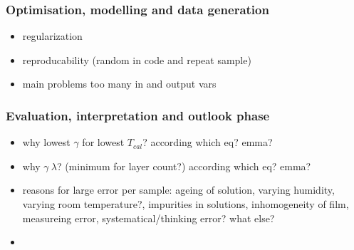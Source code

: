 \subsubsection{Optimisation, modelling and data generation}
\begin{itemize}
    \item regularization
    \item reproducability (random in code and repeat sample)
    \item main problems too many in and output vars
\end{itemize}
\subsubsection{Evaluation, interpretation and outlook phase}
\begin{itemize}
    \item why lowest $\gamma$ for lowest $T_{cal}$? according which eq? emma? 
    \item why $\gamma ~ \lambda$? (minimum for layer count?) according which eq? emma? 
    \item reasons for large error per sample: ageing of solution, varying humidity, varying room temperature?, impurities in solutions, inhomogeneity of film, measureing error, systematical/thinking error? what else? 
    \item {} 
\end{itemize}


